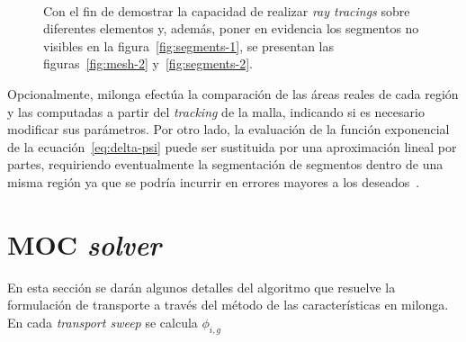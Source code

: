 \documentclass[11pt]{article}
\numberwithin{equation}{section}
\begin{document}
\begin{figure}[!h]
 \begin{center}
  \\
  \caption{Con el fin de demostrar la capacidad de realizar \emph{ray tracings} sobre diferentes elementos y, además, poner en evidencia los segmentos no visibles en la figura~\ref{fig:segments-1}, se presentan las figuras~\ref{fig:mesh-2} y~\ref{fig:segments-2}.}
  \label{fig:mesh-and-segments-2}
 \end{center}
\end{figure}

Opcionalmente, milonga efectúa la comparación de las áreas reales de cada región y las computadas a partir del \emph{tracking} de la malla, indicando si es necesario modificar sus parámetros. Por otro lado, la evaluación de la función exponencial de la ecuación~\eqref{eq:delta-psi} puede ser sustituida por una aproximación lineal por partes, requiriendo eventualmente la segmentación de segmentos dentro de una misma región ya que se podría incurrir en errores mayores a los deseados~\cite{openmoc2014}.


\section{MOC \emph{solver}}

En esta sección se darán algunos detalles del algoritmo que resuelve la formulación de transporte a través del método de las características en milonga. En cada \emph{transport sweep} se calcula $\phi_{i,g}$
\end{document}
